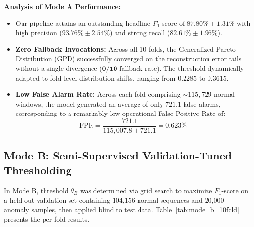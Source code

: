\textbf{Analysis of Mode A Performance:}
\begin{itemize}
    \item Our pipeline attains an outstanding headline $F_1$-score of $\mathbf{87.80\% \pm 1.31\%}$ with high precision ($93.76\% \pm 2.54\%$) and strong recall ($82.61\% \pm 1.96\%$).
    \item \textbf{Zero Fallback Invocations:} Across all 10 folds, the Generalized Pareto Distribution (GPD) successfully converged on the reconstruction error tails without a single divergence ($\mathbf{0 / 10}$ fallback rate). The threshold dynamically adapted to fold-level distribution shifts, ranging from $0.2285$ to $0.3615$.
    \item \textbf{Low False Alarm Rate:} Across each fold comprising $\sim 115,729$ normal windows, the model generated an average of only $721.1$ false alarms, corresponding to a remarkably low operational False Positive Rate of:
    \begin{equation}
        \text{FPR} = \frac{721.1}{115,007.8 + 721.1} = 0.623\%
    \end{equation}
\end{itemize}

\subsection{Mode B: Semi-Supervised Validation-Tuned Thresholding}
\label{subsec:results_mode_b}
In Mode B, threshold $\theta_B$ was determined via grid search to maximize $F_1$-score on a held-out validation set containing 104,156 normal sequences and 20,000 anomaly samples, then applied blind to test data. Table~\ref{tab:mode_b_10fold} presents the per-fold results.

